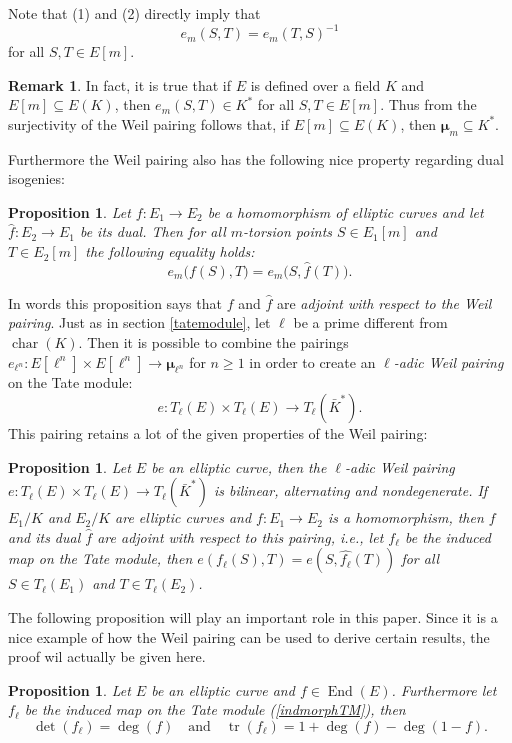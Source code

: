\documentclass{article}
\numberwithin{equation}{section}
\newtheorem{proposition}[theorem]{Proposition}
\theoremstyle{definition}
\newtheorem{remark}[theorem]{Remark}
\newcommand{\Char}[1]{\operatorname{char} (#1)} %
\newcommand{\degree}[1]{\operatorname{deg} \left(#1\right)} %
\newcommand{\detm}[1]{\operatorname{det} \left(#1\right)} %
\newcommand{\tr}[1]{\operatorname{tr} \left(#1\right)} %
\newcommand{\Endring}[1]{\operatorname{End} (#1)} %
\newcommand{\rou}[1]{\boldsymbol{\mu}_{#1}} %
\begin{document}
Note that (1) and (2) directly imply that $$e_m(S,T)=e_m(T,S)^{-1}$$ for all $S,T \in E[m]$. 


\begin{remark}\label{alltorsionptsinK}
In fact, it is true that if $E$ is defined over a field $K$ and $E[m] \subseteq E(K)$, then $e_m(S,T) \in K^*$ for all $S,T \in E[m]$. Thus from the surjectivity of the Weil pairing follows that, if $E[m] \subseteq E(K)$, then $\rou{m} \subseteq K^*$.
\end{remark}

Furthermore the Weil pairing also has the following nice property regarding dual isogenies:

\begin{proposition}
Let $f: E_1 \rightarrow E_2$ be a homomorphism of elliptic curves and let $\hat{f}: E_2 \rightarrow E_1$ be its dual. Then for all $m$-torsion points $S \in E_1[m]$ and $T \in E_2[m]$ the following equality holds: $$e_m\big(f(S),T\big)=e_m\big(S,\hat{f}(T)\big).$$
\end{proposition}

In words this proposition says that $f$ and $\hat{f}$ are \emph{adjoint with respect to the Weil pairing}. Just as in section \ref{tatemodule}, let $\ell$ be a prime different from $\Char{K}$. Then it is possible to combine the pairings $e_{\ell^n}: E[\ell^n] \times E[\ell^n] \rightarrow \rou{\ell^n}$ for $n\geq 1$ in order to create an \emph{$\ell$-adic Weil pairing} on the Tate module: $$e: T_\ell(E) \times T_\ell(E) \rightarrow T_\ell(\bar{K}^*).$$ This pairing retains a lot of the given properties of the Weil pairing:

\begin{proposition}\label{WPTate}
Let $E$ be an elliptic curve, then the $\ell$-adic Weil pairing $e:T_\ell(E) \times T_\ell(E) \rightarrow T_\ell(\bar{K}^*)$ is bilinear, alternating and nondegenerate. If $E_1/K$ and $E_2/K$ are elliptic curves and $f:E_1 \rightarrow E_2$ is a homomorphism, then $f$ and its dual $\hat{f}$ are adjoint with respect to this pairing, i.e., let $f_\ell$ be the induced map on the Tate module, then $e(f_\ell(S),T)= e(S,\hat{f_\ell}(T))$ for all $S \in T_\ell(E_1)$ and $T \in T_\ell(E_2)$.
\end{proposition}

The following proposition will play an important role in this paper. Since it is a nice example of how the Weil pairing can be used to derive certain results, the proof wil actually be given here. 

\begin{proposition}\label{detandtrace}
Let $E$ be an elliptic curve and $f \in \Endring{E}$. Furthermore let $f_\ell$ be the induced map on the Tate module (\ref{indmorphTM}), then $$\detm{f_\ell} = \degree{f} \quad \text{and} \quad \tr{f_\ell}=1+\degree{f}-\degree{1-f}.$$
\end{proposition}
\end{document}
